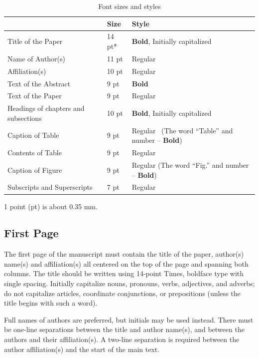 \documentclass[9pt]{extarticle}
\begin{document}
\begin{table}[!h]
	\centering
	\begin{threeparttable}
	\caption{Font sizes and styles}
	\label{table:fonts}
	\setlength\tabcolsep{0.3mm}
	\begin{tabular}{|C{29.4mm}|C{12.59mm}|C{38.69mm}|}
	\hline
	  & Size & Style \\ \hline
	  Title of the Paper & 14 pt* & \textbf{Bold}, Initially capitalized \\ \hline
	  Name of Author(s) & 11 pt & Regular \\ \hline
	  Affiliation(s) & 10 pt & Regular \\ \hline
	  Text of the Abstract & 9 pt & \textbf{Bold} \\ \hline
	  Text of the Paper & 9 pt & Regular \\ \hline
	  Headings of chapters and subsections & 10 pt & \textbf{Bold}, Initially capitalized \\ \hline
	  Caption of Table & 9 pt & Regular \ (The word ``Table'' and number -- \textbf{Bold}) \\ \hline
	  Contents of Table & 9 pt & Regular \\ \hline
	  Caption of Figure & 9 pt & Regular (The word ``Fig.'' and number -- \textbf{Bold}) \\ \hline
	  Subscripts and Superscripts & 7 pt & Regular \\	
	\hline
	\end{tabular}
	\begin{tablenotes}[flushleft]
		\item * 1 point (pt) is about 0.35 mm.
	\end{tablenotes}
	\end{threeparttable}
\end{table}

\subsection{First Page}

The first page of the manuscript must contain the title of the paper, author(s) name(s) and affiliation(s) all centered on the top of the page and spanning both columns. The title should be written using 14-point Times, boldface type with single spacing. Initially capitalize nouns, pronouns, verbs, adjectives, and adverbs; do not capitalize articles, coordinate conjunctions, or prepositions (unless the title begins with such a word).

Full names of authors are preferred, but initials may be used instead. There must be one-line separations between the title and author name(s), and between the authors and their affiliation(s). A two-line separation is required between the author affiliation(s) and the start of the main text.
\end{document}
